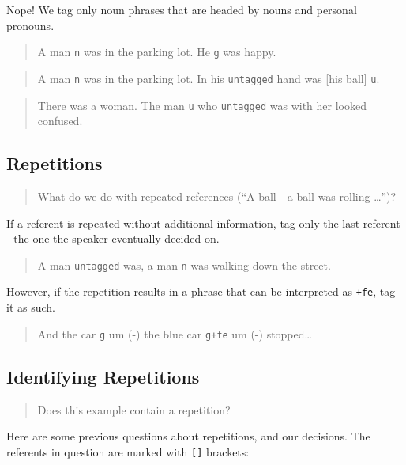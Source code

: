 \documentclass[
]{book}
\begin{document}
Nope!
We tag only noun phrases that are headed by nouns and personal pronouns.

\begin{quote}
A man \texttt{n} was in the parking lot.
He \texttt{g} was happy.
\end{quote}

\begin{quote}
A man \texttt{n} was in the parking lot.
In his \texttt{untagged} hand was {[}his ball{]} \texttt{u}.
\end{quote}

\begin{quote}
There was a woman.
The man \texttt{u} who \texttt{untagged} was with her looked confused.
\end{quote}

\hypertarget{repetitions}{%
\subsection{Repetitions}\label{repetitions}}

\begin{quote}
What do we do with repeated references (``A ball - a ball was rolling \ldots{}'')?
\end{quote}

If a referent is repeated without additional information,
tag only the last referent - the one the speaker eventually decided on.

\begin{quote}
A man \texttt{untagged} was, a man \texttt{n} was walking down the street.
\end{quote}

However,
if the repetition results in a phrase that can be interpreted as \texttt{+fe},
tag it as such.

\begin{quote}
And the car \texttt{g} um (-) the blue car \texttt{g+fe} um (-) stopped\ldots{}
\end{quote}

\hypertarget{identifying-repetitions}{%
\subsection{Identifying Repetitions}\label{identifying-repetitions}}

\begin{quote}
Does this example contain a repetition?
\end{quote}

Here are some previous questions about repetitions, and our decisions.
The referents in question are marked with \texttt{{[}{]}} brackets:
\end{document}
